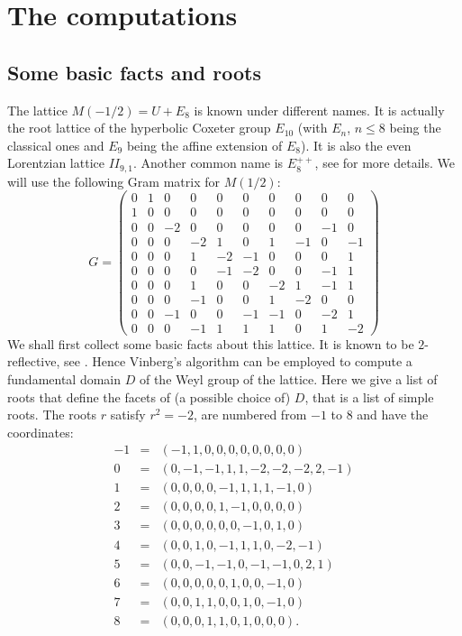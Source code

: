 \documentclass[a4paper,11pt]{article}
\begin{document}
\section{The computations}\label{sec:proof}
\subsection{Some basic facts and roots}\label{subsec:roots}

The lattice $M(-1/2) = U + E_8$ is known under different names. It is actually the root lattice of the hyperbolic Coxeter group $E_{10}$ (with $E_n$, $n\leq 8$ being the classical ones and $E_9$ being the affine extension of $E_8$). It is also the even Lorentzian lattice $II_{9,1}$. Another common name is $E_8^{++}$, see \cite{KMW} for more details.
We will use the following Gram matrix for $M(1/2)$:
\begin{equation}\label{equ:G}
G = \left(\begin{array}{cccccccccc}
0 & 1 & 0 & 0 & 0 & 0 & 0 & 0 & 0 & 0\\
1 & 0 & 0 & 0 & 0 & 0 & 0 & 0 & 0 & 0\\
0 & 0 & -2 & 0 & 0 & 0 & 0 & 0 & -1 & 0\\
0 & 0 & 0 & -2 & 1 & 0 & 1 & -1 & 0 & -1\\
0 & 0 & 0 & 1 & -2 & -1 & 0 & 0 & 0 & 1\\
0 & 0 & 0 & 0 & -1 & -2 & 0 & 0 & -1 & 1\\
0 & 0 & 0 & 1 & 0 & 0 & -2 & 1 & -1 & 1\\
0 & 0 & 0 & -1 & 0 & 0 & 1 & -2 & 0 & 0\\
0 & 0 & -1 & 0 & 0 & -1 & -1 & 0 & -2 & 1\\
0 & 0 & 0 & -1 & 1 & 1 & 1 & 0 & 1 & -2
\end{array}\right)
\end{equation}
We shall first collect some basic facts about this lattice.
It is known to be $2$-reflective, see \cite{Nik2}.
Hence Vinberg's algorithm \cite{Vin} can be employed to compute a fundamental domain $D$ of the Weyl group of the lattice.
Here we give a list of roots that define the facets of (a possible choice of) $D$, that is a list of simple roots.
The roots $r$ satisfy $r^2 = -2$, are numbered from $-1$ to $8$ and have the coordinates:
\begin{equation*}
\begin{array}{rcl}
-1 &=& (-1, 1, 0, 0, 0, 0, 0, 0, 0, 0)\\
0 &=& (0, -1, -1, 1, 1, -2, -2, -2, 2, -1)\\
1 &=& (0, 0, 0, 0, -1, 1, 1, 1, -1, 0)\\
2 &=& (0, 0, 0, 0, 1, -1, 0, 0, 0, 0)\\
3 &=& (0, 0, 0, 0, 0, 0, -1, 0, 1, 0)\\
4 &=& (0, 0, 1, 0, -1, 1, 1, 0, -2, -1)\\
5 &=& (0, 0, -1, -1, 0, -1, -1, 0, 2, 1)\\
6 &=& (0, 0, 0, 0, 0, 1, 0, 0, -1, 0)\\
7 &=& (0, 0, 1, 1, 0, 0, 1, 0, -1, 0)\\
8 &=& (0, 0, 0, 1, 1, 0, 1, 0, 0, 0).\\
\end{array}
\end{equation*}
\end{document}
